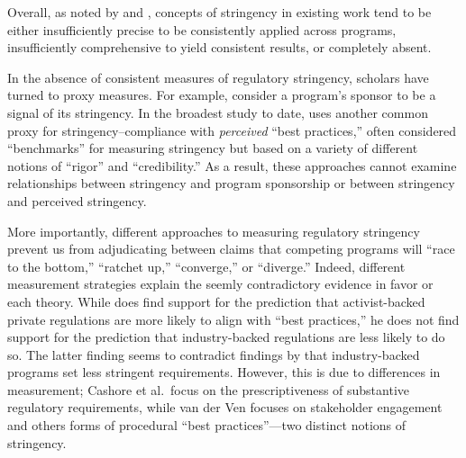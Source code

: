 \documentclass[
      12pt,
            Review ]{article}
\begin{document}
Overall, as noted by \citet{Brunel2016} and \citet{Howlett2007}, concepts of stringency in existing work tend to be either insufficiently precise to be consistently applied across programs, insufficiently comprehensive to yield consistent results, or completely absent.



In the absence of consistent measures of regulatory stringency, scholars have turned to proxy measures. For example, \citet{Darnall2010} consider a program's sponsor to be a signal of its stringency. In the broadest study to date, \citet{VanderVen2015} uses another common proxy for stringency--compliance with \emph{perceived} ``best practices,'' often considered ``benchmarks'' for measuring stringency but based on a variety of different notions of ``rigor'' and ``credibility.'' As a result, these approaches cannot examine relationships between stringency and program sponsorship or between stringency and perceived stringency.

More importantly, different approaches to measuring regulatory stringency prevent us from adjudicating between claims that competing programs will ``race to the bottom,'' ``ratchet up,'' ``converge,'' or ``diverge.'' Indeed, different measurement strategies explain the seemly contradictory evidence in favor or each theory. While \citet{VanderVen2015} does find support for the prediction that activist-backed private regulations are more likely to align with ``best practices,'' he does not find support for the prediction that industry-backed regulations are less likely to do so. The latter finding seems to contradict findings by \citet{Cashore2004} that industry-backed programs set less stringent requirements. However, this is due to differences in measurement; Cashore et al.~focus on the prescriptiveness of substantive regulatory requirements, while van der Ven focuses on stakeholder engagement and others forms of procedural ``best practices''---two distinct notions of stringency.
\end{document}
